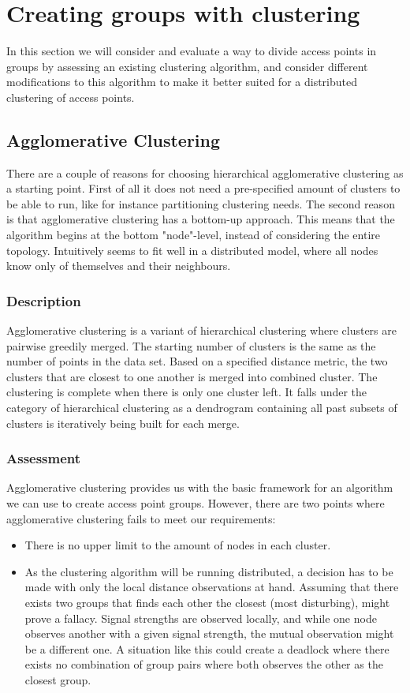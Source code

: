 \section{Creating groups with clustering}
In this section we will consider and evaluate a way to divide access points in groups by assessing an existing clustering algorithm, and consider different modifications to this algorithm
to make it better suited for a distributed clustering of access points. 

\subsection {Agglomerative Clustering}
There are a couple of reasons for choosing hierarchical agglomerative clustering as a starting point. First of all it does not need a pre-specified amount of clusters to be able to run,
like for instance partitioning clustering needs. The second reason is that agglomerative clustering has a bottom-up approach. This means that the algorithm
begins at the bottom "node"-level, instead of considering the entire topology. Intuitively seems to fit well in a distributed model, where all nodes know only of themselves and their neighbours. 

\subsubsection{Description}
Agglomerative clustering  \cite{agglomerative} is a variant of hierarchical clustering where clusters are pairwise greedily merged. The starting number of clusters is the same as the number of
points in the data set. Based on a specified distance metric, the two clusters that are closest to one another is merged into combined cluster. The clustering is complete
when there is only one cluster left. It falls under the category of hierarchical clustering as a dendrogram containing all past subsets of clusters is iteratively being built for each merge. 

\subsubsection{Assessment}
Agglomerative clustering provides us with the basic framework for an algorithm we can use to create access point groups. However, there are two points where agglomerative clustering
fails to meet our requirements: 
\begin{itemize}
	\item There is no upper limit to the amount of nodes in each cluster.
	\item As the clustering algorithm will be running distributed, a decision has to be made with only the local distance observations at hand.
		Assuming that there exists two groups that finds each other the closest (most disturbing), might prove a fallacy. Signal strengths are observed locally, and while one node observes another with a given signal strength, the mutual observation might be a different one. A situation like this could create a deadlock where there exists no combination of group pairs where both observes the other
		as the closest group. 
\end{itemize}

